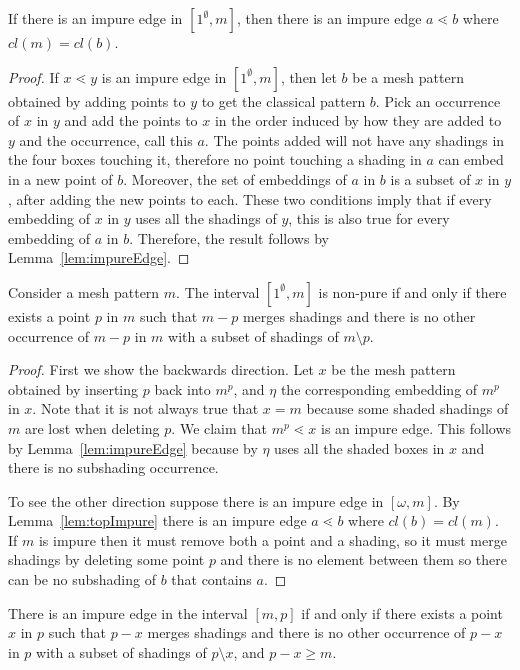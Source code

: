 \documentclass[11pt,a4paper,oneside]{article}
\begin{document}
\begin{lem}\label{lem:topImpure}
If there is an impure edge in $[1^\emptyset,m]$, then there is an impure edge $a\lessdot b$ where $cl(m)=cl(b)$.
\begin{proof}
If $x\lessdot y$ is an impure edge in $[1^\emptyset,m]$, then let $b$ be a mesh pattern obtained by adding points to $y$ to get the classical pattern $b$. Pick an occurrence of $x$ in $y$ and add the points to $x$ in the order induced by how they are added to $y$ and the occurrence, call this $a$. The points added will not have any shadings in the four boxes touching it, therefore no point touching a shading in $a$ can embed in a new point of $b$. Moreover, the set of embeddings of $a$ in $b$ is a subset of $x$ in $y$, after adding the new points to each. These two conditions imply that if every embedding of $x$ in $y$ uses all the shadings of $y$, this is also true for every embedding of $a$ in $b$. Therefore, the result follows by Lemma~\ref{lem:impureEdge}.
\end{proof}
\end{lem}

\begin{prop}
Consider a mesh pattern $m$. The interval $[1^\emptyset,m]$ is non-pure if and only if there exists a point $p$ in $m$ such that $m-p$ merges shadings and there is no other occurrence of $m-p$ in $m$ with a subset of shadings of $m\setminus p$.
\begin{proof}
First we show the backwards direction. Let $x$  be the mesh pattern obtained by inserting $p$ back into $m^p$, and $\eta$ the corresponding embedding of $m^p$ in $x$. Note that it is not always true that $x=m$ because some shaded shadings of $m$ are lost when deleting $p$. We claim that $m^p\lessdot x$ is an impure edge. This follows by Lemma~\ref{lem:impureEdge} because by $\eta$ uses all the shaded boxes in $x$ and there is no subshading occurrence.

To see the other direction suppose there is an impure edge in $[\omega,m]$. By Lemma~\ref{lem:topImpure} there is an impure edge $a\lessdot b$ where $cl(b)=cl(m)$. If $m$ is impure then it must remove both a point and a shading, so it must merge shadings by deleting some point $p$ and there is no element between them so there can be no subshading of $b$ that contains $a$.
\end{proof}
\end{prop}

\begin{cor}
There is an impure edge in the interval $[m,p]$ if and only if there exists a point $x$ in $p$ such that $p-x$ merges shadings and there is no other occurrence of $p-x$ in $p$ with a subset of shadings of $p\setminus x$, and $p-x\ge m$.
\end{cor}
\end{document}
